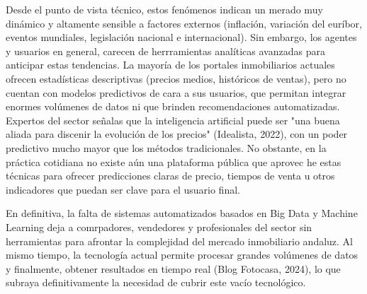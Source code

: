 \documentclass[a4paper,11pt]{book}
\begin{document}
Desde el punto de vista técnico, estos fenómenos indican un merado muy dinámico y altamente sensible a factores externos (inflación, variación del euríbor, eventos mundiales, legislación nacional e internacional). Sin embargo, los agentes y usuarios en general, carecen de herrramientas analíticas avanzadas para anticipar estas tendencias. La mayoría de los portales inmobiliarios actuales ofrecen estadísticas descriptivas (precios medios, históricos de ventas), pero no cuentan con modelos predictivos de cara a sus usuarios, que permitan integrar enormes volúmenes de datos ni que brinden recomendaciones automatizadas. Expertos del sector señalas que la inteligencia artificial puede ser "una buena aliada para discenir la evolución de los precios" (Idealista, 2022), con un poder predictivo mucho mayor que los métodos tradicionales.
No obstante, en la práctica cotidiana no existe aún una plataforma pública que aprovec he estas técnicas para ofrecer predicciones claras de precio, tiempos de venta u otros indicadores que puedan ser clave para el usuario final. 

En definitiva, la falta de sistemas automatizados basados en Big Data y Machine Learning deja a comrpadores, vendedores y profesionales del sector sin herramientas para afrontar la complejidad del mercado inmobiliario andaluz. Al mismo tiempo, la tecnología actual permite procesar grandes volúmenes de datos y finalmente, obtener resultados en tiempo real (Blog Fotocasa, 2024), lo que subraya definitivamente la necesidad de cubrir este vacío tecnológico.
\end{document}
